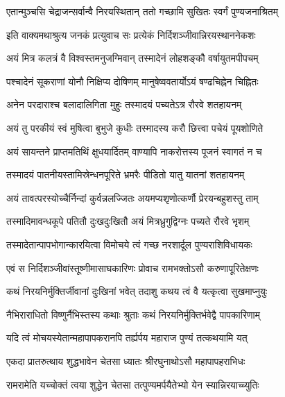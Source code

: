 \twolineshloka
{एतान्मुञ्चसि चेद्राजन्सर्वान्वै निरयस्थितान्}
{ततो गच्छामि सुखितः स्वर्गं पुण्यजनाश्रितम्}%


\twolineshloka
{इति वाक्यमथाश्रुत्य जनकं प्रत्युवाच सः}
{प्रत्येकं निर्दिशञ्जीवान्निरयस्थाननेकशः}%


\twolineshloka
{अयं मित्र कलत्रं वै विश्वस्तमनुजग्मिवान्}
{तस्मादेनं लोहशङ्कौ वर्षायुतमपीपचम्}%

\twolineshloka
{पश्चादेनं सूकराणां योनौ निक्षिप्य दोषिणम्}
{मानुषेष्ववतार्योऽयं षण्ढचिह्नेन चिह्नितः}%

\twolineshloka
{अनेन परदाराश्च बलादालिगिता मुहुः}
{तस्मादयं पच्यतेऽत्र रौरवे शतहायनम्}%

\twolineshloka
{अयं तु परकीयं स्वं मुषित्वा बुभुजे कुधीः}
{तस्मादस्य करौ छित्त्वा पचेयं पूयशोणिते}%

\twolineshloka
{अयं सायन्तने प्राप्तमतिथिं क्षुधयार्दितम्}
{वाण्यापि नाकरोत्तस्य पूजनं स्वागतं न च}%

\twolineshloka
{तस्मादयं पातनीयस्तामिस्रेन्धनपूरिते}
{भ्रमरैः पीडितो यातु यातनां शतहायनम्}%

\twolineshloka
{अयं तावत्परस्योच्चैर्निन्दां कुर्वन्नलज्जितः}
{अयमप्यशृणोत्कर्णौ प्रेरयन्बहुशस्तु ताम्}%

\twolineshloka
{तस्मादिमावन्धकूपे पतितौ दुःखदुःखितौ}
{अयं मित्रध्रुगुद्विग्नः पच्यते रौरवे भृशम्}%

\twolineshloka
{तस्मादेतान्पापभोगान्कारयित्वा विमोचये}
{त्वं गच्छ नरशार्दूल पुण्यराशिविधायकः}%


\twolineshloka
{एवं स निर्दिशञ्जीवांस्तूष्णीमासाघकारिणः}
{प्रोवाच रामभक्तोऽसौ करुणापूरितेक्षणः}%


\twolineshloka
{कथं निरयनिर्मुक्तिर्जीवानां दुःखिनां भवेत्}
{तदाशु कथय त्वं वै यत्कृत्वा सुखमाप्नुयुः}%


\twolineshloka
{नैभिराराधितो विष्णुर्नैभिस्तस्य कथाः श्रुताः}
{कथं निरयनिर्मुक्तिर्भवेद्वै पापकारिणाम्}%

\twolineshloka
{यदि त्वं मोचयस्येतान्महापापकरानपि}
{तर्ह्यर्पय महाराज पुण्यं तत्कथयामि यत्}%

\twolineshloka
{एकदा प्रातरुत्थाय शुद्धभावेन चेतसा}
{ध्यातः श्रीरघुनाथोऽसौ महापापहराभिधः}%

\twolineshloka
{रामरामेति यच्चोक्तं त्वया शुद्धेन चेतसा}
{तत्पुण्यमर्पयैतेभ्यो येन स्यान्निरयाच्च्युतिः}%

